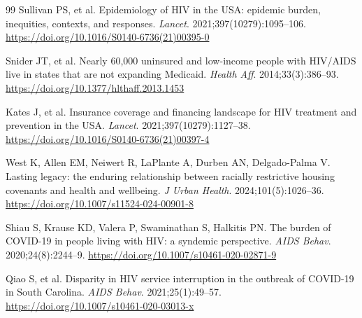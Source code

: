\documentclass[11pt,letterpaper]{article}
\begin{document}
\begin{thebibliography}{99}
 Sullivan PS, et al. Epidemiology of HIV in the USA: epidemic burden, inequities, contexts, and responses. \textit{Lancet}. 2021;397(10279):1095--106. \url{https://doi.org/10.1016/S0140-6736(21)00395-0}

 Snider JT, et al. Nearly 60,000 uninsured and low-income people with HIV/AIDS live in states that are not expanding Medicaid. \textit{Health Aff}. 2014;33(3):386--93. \url{https://doi.org/10.1377/hlthaff.2013.1453}

 Kates J, et al. Insurance coverage and financing landscape for HIV treatment and prevention in the USA. \textit{Lancet}. 2021;397(10279):1127--38. \url{https://doi.org/10.1016/S0140-6736(21)00397-4}

 West K, Allen EM, Neiwert R, LaPlante A, Durben AN, Delgado-Palma V. Lasting legacy: the enduring relationship between racially restrictive housing covenants and health and wellbeing. \textit{J Urban Health}. 2024;101(5):1026--36. \url{https://doi.org/10.1007/s11524-024-00901-8}

 Shiau S, Krause KD, Valera P, Swaminathan S, Halkitis PN. The burden of COVID-19 in people living with HIV: a syndemic perspective. \textit{AIDS Behav}. 2020;24(8):2244--9. \url{https://doi.org/10.1007/s10461-020-02871-9}

 Qiao S, et al. Disparity in HIV service interruption in the outbreak of COVID-19 in South Carolina. \textit{AIDS Behav}. 2021;25(1):49--57. \url{https://doi.org/10.1007/s10461-020-03013-x}

\end{thebibliography}
\endgroup
\end{document}
